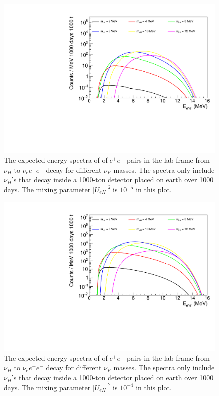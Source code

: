 \documentclass[%
 reprint,
 amsmath,amssymb,
 aps,
 prd,
twocolumn,
]{revtex4-1}
\begin{document}
\begin{figure}[!ht]
\includegraphics[width=0.99\columnwidth]{../plots/EeeSpectrum_decay_in_detector_integrate_U1e-05_AllMass_linXlogY.pdf}
\caption{The expected energy spectra of of $e^+e^-$ pairs in the lab frame from $\nu_H$ to $\nu_e e^+ e^-$ decay for  different $\nu_H$ masses. 
The spectra only include $\nu_H$'s that decay inside a 1000-ton detector placed on earth over 1000 days. 
The mixing parameter $|U_{eH}|^2$ is  $10^{-5}$ in this plot.}
\label{fig:EeeSpectrum_in_detector_U1em5} 
\end{figure}

\begin{figure}[!ht]
\includegraphics[width=0.99\columnwidth]{../plots/EeeSpectrum_decay_in_detector_integrate_U0.0001_AllMass_linXlogY.pdf}
\caption{The expected energy spectra of of $e^+e^-$ pairs in the lab frame from $\nu_H$ to $\nu_e e^+ e^-$ decay for  different $\nu_H$ masses. 
The spectra only include $\nu_H$'s that decay inside a 1000-ton detector placed on earth over 1000 days. 
The mixing parameter $|U_{eH}|^2$ is  $10^{-4}$ in this plot.}
\label{fig:EeeSpectrum_in_detector_U1em4} 
\end{figure}
\end{document}
